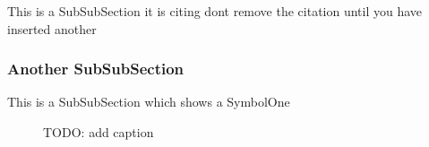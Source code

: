 \documentclass[class=report,11pt,crop=false]{standalone}
\begin{document}
This is a SubSubSection it is citing dont remove the citation until you have inserted
another \cite{levanon2004radar}

\subsubsection{Another SubSubSection}

This is a SubSubSection which shows a \gls{SymbolOne}

\begin{figure}[H]
    \centering
    
    \caption{TODO: add caption}
    \label{fig:submarine_emission_spectrum}
\end{figure}



\ifstandalone
    \printbibliography  %
\fi
\end{document}
